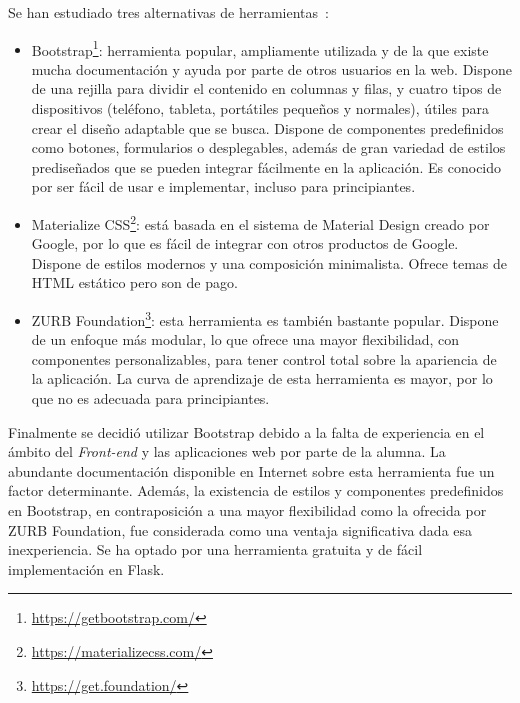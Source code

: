Se han estudiado tres alternativas de herramientas~\cite{alternativaBootstrap, responsiveCSS}:
\begin{itemize}
    \item Bootstrap\footnote{\url{https://getbootstrap.com/}}: herramienta popular, ampliamente utilizada y de la que existe mucha documentación y ayuda por parte de otros usuarios en la web. Dispone de una rejilla para dividir el contenido en columnas y filas, y cuatro tipos de dispositivos (teléfono, tableta, portátiles pequeños y normales), útiles para crear el diseño adaptable que se busca. Dispone de componentes predefinidos como botones, formularios o desplegables, además de gran variedad de estilos prediseñados que se pueden integrar fácilmente en la aplicación. Es conocido por ser fácil de usar e implementar, incluso para principiantes.
    \item Materialize CSS\footnote{\url{https://materializecss.com/}}: está basada en el sistema de Material Design creado por Google, por lo que es fácil de integrar con otros productos de Google. Dispone de estilos modernos y una composición minimalista. Ofrece temas de HTML estático pero son de pago.
    \item ZURB Foundation\footnote{\url{https://get.foundation/}}: esta herramienta es también bastante popular. Dispone de un enfoque más modular, lo que ofrece una mayor flexibilidad, con componentes personalizables, para tener control total sobre la apariencia de la aplicación. La curva de aprendizaje de esta herramienta es mayor, por lo que no es adecuada para principiantes.
\end{itemize}
Finalmente se decidió utilizar Bootstrap debido a la falta de experiencia en el ámbito del \textit{Front-end} y las aplicaciones web por parte de la alumna. La abundante documentación disponible en Internet sobre esta herramienta fue un factor determinante. Además, la existencia de estilos y componentes predefinidos en Bootstrap, en contraposición a una mayor flexibilidad como la ofrecida por ZURB Foundation, fue considerada como una ventaja significativa dada esa inexperiencia. Se ha optado por una herramienta gratuita y de fácil implementación en Flask. 




